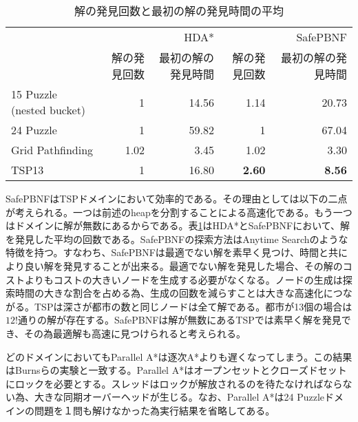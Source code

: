 \documentclass[uplatex]{jsarticle}
\begin{document}


\begin{table}[h]
	\centering
	\begin{tabular}{lrrrr} \hline
		 & &             HDA* & & SafePBNF \\ 
		 &  解の発見回数 & 最初の解の発見時間 & 解の発見回数 & 最初の解の発見時間 \\ \hline
		15 Puzzle (nested bucket)& 1 & 14.56 & 1.14 & 20.73 \\ 
		24 Puzzle & 1 & 59.82 & 1 & 67.04 \\ 
		Grid Pathfinding & 1.02 & 3.45 & 1.02 & 3.30 \\ 
		TSP13 & 1 & 16.80 & \textbf{2.60} & \textbf{8.56} \\ \hline
	\end{tabular}
	\caption{解の発見回数と最初の解の発見時間の平均}
	\label{hdastar_incumbent}
\end{table}


SafePBNFはTSPドメインにおいて効率的である。その理由としては以下の二点が考えられる。一つは前述のheapを分割することによる高速化である。もう一つはドメインに解が無数にあるからである。表\ref{hdastar_incumbent}はHDA*とSafePBNFにおいて、解を発見した平均の回数である。SafePBNFの探索方法はAnytime Searchのような特徴を持つ\cite{Burns2010}。すなわち、SafePBNFは最適でない解を素早く見つけ、時間と共により良い解を発見することが出来る。最適でない解を発見した場合、その解のコストよりもコストの大きいノードを生成する必要がなくなる。ノードの生成は探索時間の大きな割合を占める為、生成の回数を減らすことは大きな高速化につながる。TSPは深さが都市の数と同じノードは全て解である。都市が13個の場合は$12!$通りの解が存在する。SafePBNFは解が無数にあるTSPでは素早く解を発見でき、その為最適解も高速に見つけられると考えられる。

どのドメインにおいてもParallel A*は逐次A*よりも遅くなってしまう。この結果はBurnsらの実験と一致する\cite{Burns2010}。Parallel A*はオープンセットとクローズドセットにロックを必要とする。スレッドはロックが解放されるのを待たなければならない為、大きな同期オーバーヘッドが生じる。なお、Parallel A*は24 Puzzleドメインの問題を１問も解けなかった為実行結果を省略してある。 %
\end{document}
